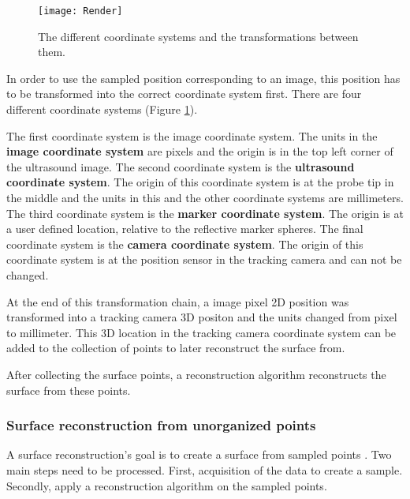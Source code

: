 \begin{figure}[H]
  \centering
  \texttt{[image: Render]}
  \caption{The different coordinate systems and the transformations between them.}
  \label{fig:Render}
\end{figure}

In order to use the sampled position corresponding to an image, this
position has to be transformed into the correct coordinate system first. There
are four different coordinate systems (Figure \ref{fig:Render}).

The first coordinate system is the image
coordinate system. The units in the \textbf{image coordinate system} are pixels and the
origin is in the top left corner of the ultrasound image.
The second coordinate system is the \textbf{ultrasound coordinate system}. The origin of this
coordinate system is at the probe tip in the middle and the units in this and
the other coordinate systems are millimeters.
The third coordinate system is the
\textbf{marker coordinate system}. The origin is at a user defined
location, relative to the reflective marker spheres.
The final coordinate system is the \textbf{camera coordinate system}. The origin of this
coordinate system is at the position sensor in the tracking camera and can not
be changed.

At the end of this transformation chain, a image pixel 2D position was
transformed into a tracking camera 3D positon and the units changed
from pixel to millimeter. This 3D location in the tracking camera coordinate system
can be added to the collection of points to later reconstruct the surface from.

After collecting the surface points, a reconstruction algorithm reconstructs the surface from these points.
\subsubsection{Surface reconstruction from unorganized points}
A surface reconstruction's goal is to create a surface from sampled points \cite{berger2017survey}. Two
main steps need to be processed. First, acquisition of the data to create a sample. Secondly,
apply a reconstruction algorithm on the sampled points.

